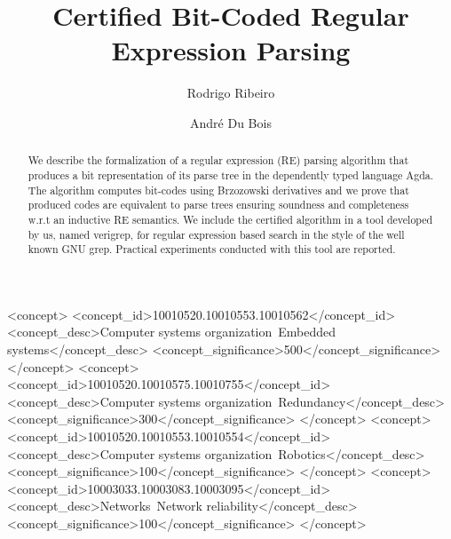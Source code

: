 \documentclass[sigconf]{acmart}
\def\resethooks{%
  \global\let\SaveRestoreHook\empty
  \global\let\ColumnHook\empty}
\let\hspre\empty
\let\hspost\empty
\theoremstyle{definition}
\newcommand{\V}[1]{\purple{\mathit{#1}}}
\begin{document}
\title{Certified Bit-Coded Regular Expression Parsing}

\author{Rodrigo Ribeiro}

\author{André Du Bois}

\begin{abstract}
We describe the formalization of a regular expression (RE) parsing
algorithm that produces a bit representation of its parse tree
in the dependently typed language Agda. The algorithm computes
bit-codes using Brzozowski derivatives and we prove that 
produced codes are equivalent to parse trees ensuring  
soundness and completeness w.r.t an inductive RE semantics.
We include the certified algorithm in a tool developed by us, 
named verigrep, for regular expression based search in the style 
of the well known GNU grep. Practical experiments conducted with this tool 
are reported.
\end{abstract}
%
%
\begin{CCSXML}\begin{hscode}\SaveRestoreHook
\column{B}{@{}>{\hspre}l<{\hspost}@{}}%
\column{E}{@{}>{\hspre}l<{\hspost}@{}}%
\>[B]{}\V{ccs2012>}{}\<[E]%
\ColumnHook
\end{hscode}\resethooks
 <concept>
  <concept_id>10010520.10010553.10010562</concept_id>
  <concept_desc>Computer systems organization~Embedded systems</concept_desc>
  <concept_significance>500</concept_significance>
 </concept>
 <concept>
  <concept_id>10010520.10010575.10010755</concept_id>
  <concept_desc>Computer systems organization~Redundancy</concept_desc>
  <concept_significance>300</concept_significance>
 </concept>
 <concept>
  <concept_id>10010520.10010553.10010554</concept_id>
  <concept_desc>Computer systems organization~Robotics</concept_desc>
  <concept_significance>100</concept_significance>
 </concept>
 <concept>
  <concept_id>10003033.10003083.10003095</concept_id>
  <concept_desc>Networks~Network reliability</concept_desc>
  <concept_significance>100</concept_significance>
 </concept>\begin{hscode}\SaveRestoreHook
\column{B}{@{}>{\hspre}l<{\hspost}@{}}%
\column{E}{@{}>{\hspre}l<{\hspost}@{}}%
\>[B]{}\V{/ccs2012>}{}\<[E]%
\ColumnHook
\end{hscode}\resethooks
\end{CCSXML}
\end{document}

